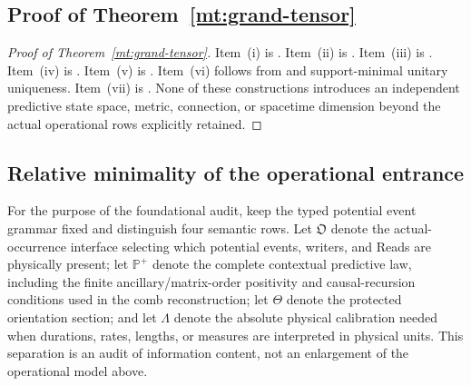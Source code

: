 \documentclass[11pt]{article}
\theoremstyle{definition}
\theoremstyle{remark}
\begin{document}
\subsection{Proof of Theorem~\ref{mt:grand-tensor}}

\begin{proof}[Proof of Theorem~\ref{mt:grand-tensor}]
Item~\textup{(i)} is
.  Item~\textup{(ii)}
is .  Item~\textup{(iii)} is
.  Item~\textup{(iv)} is
.  Item~\textup{(v)} is
.  Item~\textup{(vi)}
follows from 
and support-minimal unitary uniqueness.  Item~\textup{(vii)} is
.  None of these constructions
introduces an independent predictive state space, metric, connection, or
spacetime dimension beyond the actual operational rows explicitly retained.
\end{proof}

\subsection{Relative minimality of the operational entrance}
\label{subsec:supp-relative-minimality}

For the purpose of the foundational audit, keep the typed potential event
grammar fixed and distinguish four semantic rows.  Let $\mathfrak O$ denote
the actual-occurrence interface selecting which potential events, writers, and
Reads are physically present; let $\mathbb P^+$ denote the complete contextual
predictive law, including the finite ancillary/matrix-order positivity and
causal-recursion conditions used in the comb reconstruction; let $\Theta$
denote the protected orientation section; and let $\Lambda$ denote the
absolute physical calibration needed when durations, rates, lengths, or
measures are interpreted in physical units.  This separation is an audit of
information content, not an enlargement of the operational model above.
\end{document}
